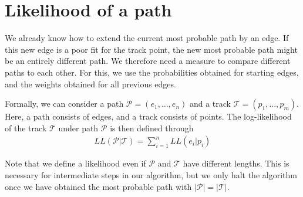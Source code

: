 \documentclass[notitlepage]{scrarticle}
\begin{document}
\section{Likelihood of a path}\label{sec:likelihood_path}
We already know how to extend the current most probable path by an edge.
If this new edge is a poor fit for the track point, the new most probable path might be an entirely different path.
We therefore need a measure to compare different paths to each other.
For this, we use the probabilities obtained for starting edges, and the weights obtained for all previous edges.

Formally, we can consider a path $\mathcal P=\left(e_1,\ldots,e_n\right)$ and a track $\mathcal T=\left(p_1,\ldots,p_m\right)$.
Here, a path consists of edges, and a track consists of points.
The log-likelihood of the track $\mathcal T$ under path $\mathcal P$ is then defined through
%
\begin{align*}
	LL(\mathcal P|\mathcal T)=\sum_{i=1}^nLL(e_i|p_i)
\end{align*}

Note that we define a likelihood even if $\mathcal P$ and $\mathcal T$ have different lengths.
This is necessary for intermediate steps in our algorithm, but we only halt the algorithm once we have obtained the most probable path with $|\mathcal P|=|\mathcal T|$.
\end{document}

